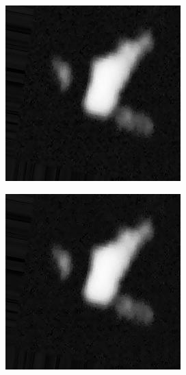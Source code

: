 \begin{figure}[h!]
	\centering
	\begin{minipage}{.5\textwidth}
		\centering
		\includegraphics[width=0.8\linewidth]{inc/img/nc_b_s5}
		\label{fig:nc_b_s5}
	\end{minipage}%
	\begin{minipage}{.5\textwidth}
		\centering
		\includegraphics[width=0.8\linewidth]{inc/img/nc_b_s7}
		\label{fig:nc_b_s7}
	\end{minipage}
\end{figure}

